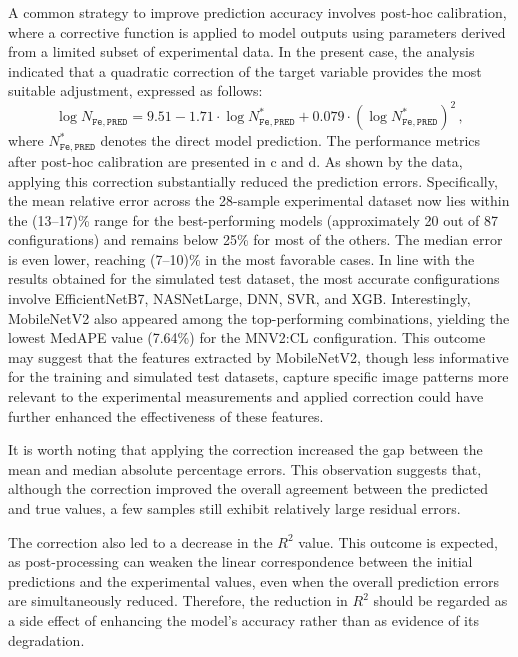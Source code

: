 \documentclass[10pt]{iopart}
\begin{document}
A common strategy to improve prediction accuracy involves post-hoc calibration,
where a corrective function is applied to model outputs using parameters derived from a limited subset of experimental data.
In the present case, the analysis indicated that a quadratic correction of the target variable provides
the most suitable adjustment, expressed as follows:
\begin{equation}\label{eqPostHoc}
  \log N_\mathtt{Fe,PRED}=9.51-1.71\cdot \log N_\mathtt{Fe,PRED}^{*} + 0.079 \cdot (\log N_\mathtt{Fe,PRED}^{*})^2\,,
\end{equation}
where $N_\mathtt{Fe,PRED}^{*}$ denotes the direct model prediction.
The performance metrics after post-hoc calibration are presented in c and d.
As shown by the data, applying this correction substantially reduced the prediction errors.
Specifically, the mean relative error across the 28-sample experimental dataset now lies within the (13–17)\% range
for the best-performing models (approximately 20 out of 87 configurations) and remains below 25\% for most of the others.
The median error is even lower, reaching (7–10)\% in the most favorable cases.
In line with the results obtained for the simulated test dataset, the most accurate configurations involve EfficientNetB7, NASNetLarge, DNN, SVR, and XGB.
Interestingly, MobileNetV2 also appeared among the top-performing combinations, yielding the lowest MedAPE value (7.64\%) for the MNV2:CL configuration.
This outcome may suggest that the features extracted by MobileNetV2, though less informative for the training and simulated test datasets,
capture specific image patterns more relevant to the experimental measurements and applied correction could have further enhanced the effectiveness of these features.

It is worth noting that applying the correction increased the gap between the mean and median absolute percentage errors.
This observation suggests that, although the correction improved the overall agreement between the predicted and true values,
a few samples still exhibit relatively large residual errors.

The correction also led to a decrease in the $R^2$ value.
This outcome is expected, as post-processing can weaken the linear correspondence between the initial predictions and the experimental values,
even when the overall prediction errors are simultaneously reduced.
Therefore, the reduction in $R^2$ should be regarded as a side effect of enhancing
the model’s accuracy rather than as evidence of its degradation.
\end{document}
